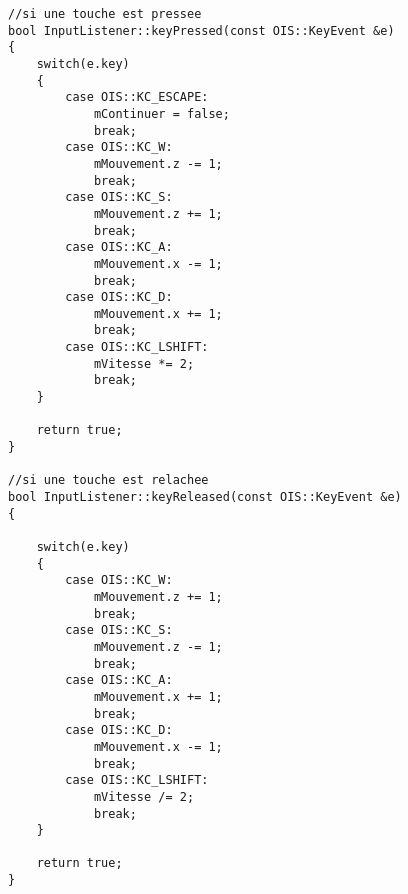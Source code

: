 \begin{lstlisting}[caption={InputListener.cpp}]
//si une touche est pressee
bool InputListener::keyPressed(const OIS::KeyEvent &e)
{
    switch(e.key)
    {
        case OIS::KC_ESCAPE:
            mContinuer = false;
            break;
        case OIS::KC_W:
            mMouvement.z -= 1;
            break;
        case OIS::KC_S:
            mMouvement.z += 1;
            break;
        case OIS::KC_A:
            mMouvement.x -= 1;
            break;
        case OIS::KC_D:
            mMouvement.x += 1;
            break;
        case OIS::KC_LSHIFT:
            mVitesse *= 2;
            break;
    }
    
    return true;
}

//si une touche est relachee
bool InputListener::keyReleased(const OIS::KeyEvent &e)
{
    
    switch(e.key)
    {
        case OIS::KC_W:
            mMouvement.z += 1;
            break;
        case OIS::KC_S:
            mMouvement.z -= 1;
            break;
        case OIS::KC_A:
            mMouvement.x += 1;
            break;
        case OIS::KC_D:
            mMouvement.x -= 1;
            break;
        case OIS::KC_LSHIFT:
            mVitesse /= 2;
            break;
    } 
    
    return true;
}
\end{lstlisting}
